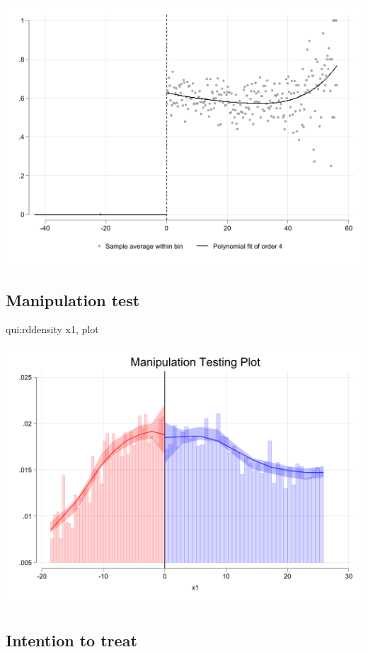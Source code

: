 \documentclass[
  letterpaper,
  DIV=11,
  numbers=noendperiod]{scrartcl}
\newenvironment{Shaded}{\begin{snugshade}}{\end{snugshade}}
\newcommand{\KeywordTok}[1]{\textcolor[rgb]{0.00,0.23,0.31}{#1}}
\newcommand{\NormalTok}[1]{\textcolor[rgb]{0.00,0.23,0.31}{#1}}
\begin{document}
\includegraphics{11rdd_files/figure-pdf/cell-8-output-1.png}

\subsection{Manipulation test}\label{manipulation-test}

\begin{Shaded}
\begin{Highlighting}[]
\KeywordTok{qui}\NormalTok{:rddensity x1, plot}
\end{Highlighting}
\end{Shaded}

\includegraphics{11rdd_files/figure-pdf/cell-9-output-1.png}

\subsection{Intention to treat}\label{intention-to-treat}
\end{document}
